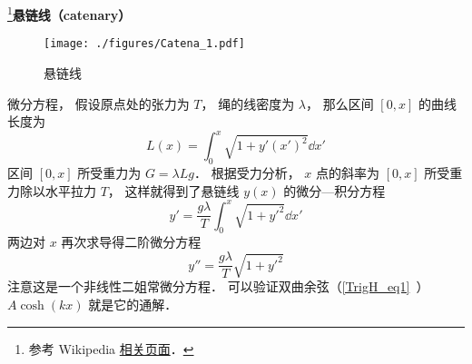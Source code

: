 
\footnote{参考 Wikipedia \href{https://en.wikipedia.org/wiki/Catenary}{相关页面}．}\textbf{悬链线（catenary）}

\begin{figure}[ht]
\centering
\texttt{[image: ./figures/Catena\_1.pdf]}
\caption{悬链线} \label{Catena_fig1}
\end{figure}

微分方程， 假设原点处的张力为 $T$， 绳的线密度为 $\lambda$， 那么区间 $[0, x]$ 的曲线长度为
\begin{equation}
L(x) = \int_0^x \sqrt{1 + y'(x')^2} \dd{x'}
\end{equation}
区间 $[0, x]$ 所受重力为 $G = \lambda L g$． 根据受力分析， $x$ 点的斜率为 $[0, x]$ 所受重力除以水平拉力 $T$， 这样就得到了悬链线 $y(x)$ 的微分—积分方程
\begin{equation}
y' = \frac{g\lambda}{T} \int_0^x \sqrt{1 + y'^2} \dd{x'}
\end{equation}
两边对 $x$ 再次求导得二阶微分方程
\begin{equation}
y'' = \frac{g\lambda}{T} \sqrt{1 + y'^2}
\end{equation}
注意这是一个非线性二姐常微分方程． 可以验证双曲余弦（\autoref{TrigH_eq1}~） $A\cosh(kx)$ 就是它的通解．
